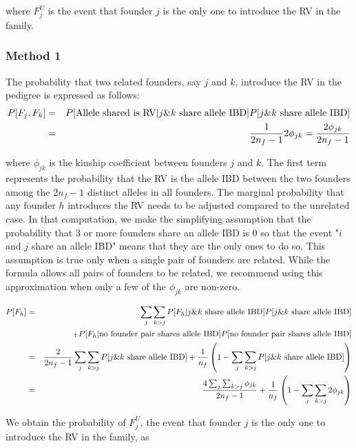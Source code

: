 \documentclass[12pt]{aastex}
\begin{document}
where $F_j^U$ is the event that founder $j$ is the only one to introduce the RV in the family.

\subsubsection{Method 1}

The probability that two related founders, say $j$ and $k$, introduce the RV in the pedigree is expressed as follows:
\begin{eqnarray}
P[F_j, F_k] &=& P[\mbox{Allele shared is RV} | j \& k \mbox{ share allele IBD}] P[j \& k \mbox{ share allele IBD}] \\
 &=& {1 \over 2n_f - 1} 2 \phi_{jk} = {2 \phi_{jk} \over 2n_f - 1} \nonumber
\end{eqnarray}

where $\phi_{jk}$ is the kinship coefficient between founders $j$ and $k$. The first term represents the probability that the RV is the allele IBD between the two founders among the $2n_f - 1$ distinct alleles in all founders. The marginal probability that any founder $h$ introduces the RV needs to be adjusted compared to the unrelated case. In that computation, we make the simplifying assumption that the probability that 3 or more founders share an allele IBD is 0 so that the event "$i$ and $j$ share an allele IBD" means that they are the only ones to do so. This assumption is true only when a single pair of founders are related. While the formula allows all pairs of founders to be related, we recommend using this approximation when only a few of the $\phi_{jk}$ are non-zero.

\begin{eqnarray}
P[F_h] &=& \sum_j \sum_{k>j} P[F_h| j \& k \mbox{ share allele IBD}] P[j \& k \mbox{ share allele IBD}] \\
 & & + P[F_h| \mbox{no founder pair shares allele IBD}] P[\mbox{no founder pair shares allele IBD}] \nonumber \\
 &=& {2 \over 2n_f - 1} \sum_j \sum_{k>j} P[j \& k \mbox{ share allele IBD}] + {1 \over n_f} \left(1 - \sum_j \sum_{k>j} P[j \& k \mbox{ share allele IBD}]\right ) \nonumber \\
&=& {4 \sum_j \sum_{k>j} \phi_{jk} \over 2n_f - 1} + {1 \over n_f} \left(1 - \sum_j \sum_{k>j} 2 \phi_{jk}\right)\nonumber
\end{eqnarray}

We obtain the probability of $F_j^U$, the event that founder $j$ is the only one to introduce the RV in the family, as
\end{document}
